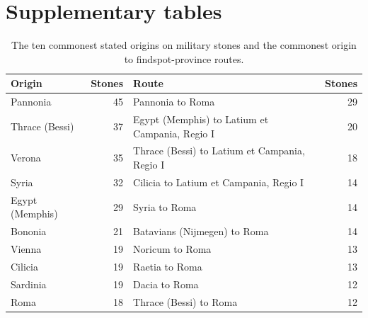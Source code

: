 \documentclass[11pt,a4paper]{article}
\begin{document}
\section{Supplementary tables}
\begin{table}[tbp]\centering\footnotesize\caption{The ten commonest stated origins on military stones and the commonest origin to findspot-province routes.}\label{tab:routes}\begin{tabular}{lrlr}\toprule Origin & Stones & Route & Stones\\\midrule
Pannonia & 45 & Pannonia to Roma & 29\\
Thrace (Bessi) & 37 & Egypt (Memphis) to Latium et Campania, Regio I & 20\\
Verona & 35 & Thrace (Bessi) to Latium et Campania, Regio I & 18\\
Syria & 32 & Cilicia to Latium et Campania, Regio I & 14\\
Egypt (Memphis) & 29 & Syria to Roma & 14\\
Bononia & 21 & Batavians (Nijmegen) to Roma & 14\\
Vienna & 19 & Noricum to Roma & 13\\
Cilicia & 19 & Raetia to Roma & 13\\
Sardinia & 19 & Dacia to Roma & 12\\
Roma & 18 & Thrace (Bessi) to Roma & 12\\
\bottomrule\end{tabular}\end{table}
\end{document}
